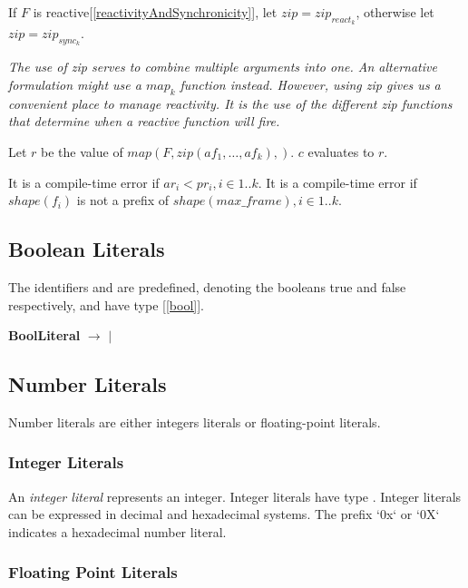 \documentclass{article}
\begin{document}
If $F$ is reactive[\ref{reactivityAndSynchronicity}], let $zip = zip_{react_k}$, otherwise let $zip = zip_{sync_k}$.

{\em
The use of zip serves to combine multiple arguments into one. An alternative formulation might use a $map_k$ function instead.
However, using zip gives us a convenient place to manage reactivity.
It is the use of the different zip functions that determine when a reactive function will fire. 
}

Let $r$ be the value of $map(F, zip(af_1, \ldots, af_k),)$. $c$ evaluates to $r$.



It is a compile-time error if $ar_i < pr_i, i \in 1..k$. It is a compile-time error if $shape(f_i)$ is not a prefix of $shape(max\_frame), i \in 1..k$. 


\subsection{Boolean Literals}
\label{booleanLiterals}

The identifiers \TRUE{} and \FALSE{} are predefined,  denoting the booleans true and false respectively, and have type \BOOL{} [\ref{bool}].

{\bf BoolLiteral} $\rightarrow$ \TRUE{} $|$ \FALSE{}

\subsection{Number Literals}
\label{numberLiterals}

Number literals are either integers literals or floating-point literals.

\NumberLiteral{}

\subsubsection{Integer Literals}
\label{integerLiterals}

An {\em integer literal} represents an integer.  Integer literals have type \INT{}.
Integer literals can be expressed in decimal and hexadecimal systems. The prefix `0x` or `0X` indicates a hexadecimal number literal. 

\subsubsection{Floating Point Literals}
\label{floatingPointLiterals}
\end{document}
